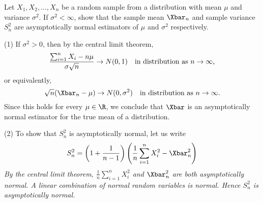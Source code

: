 
\begin{example}
Let $X_1,X_2,\ldots,X_n$ be a random sample from a distribution with mean $\mu$ and variance $\sigma^2$. If $\sigma^2<\infty$, show that the sample mean $\Xbar_n$ and sample variance $S^2_n$ are asymptotically normal estimators of $\mu$ and $\sigma^2$ respectively.

\begin{solution}
(1) If $\sigma^2>0$, then by the central limit theorem,
\[
\frac{\sum_{i=1}^n X_i- n\mu}{\sigma\sqrt{n}} \to N(0,1) \text{\quad in distribution as $n\to\infty$,}
\]
or equivalently,
\[
\sqrt{n}(\Xbar_n-\mu) \to N(0,\sigma^2) \text{\quad in distribution as $n\to\infty$.}
\]
Since this holds for every $\mu\in\R$, we conclude that $\Xbar$ is an asymptotically normal estimator for the true mean of a distribution.

(2) To show that $S^2_n$ is asymptotically normal, let us write
\[
S^2_n 	= \left(1+\frac{1}{n-1}\right)\left(\frac{1}{n}\sum_{i=1}^n X_i^2 - \Xbar_n^2\right)
\]
\bit
\it By the central limit theorem, $\displaystyle\frac{1}{n}\sum_{i=1}^n X_i^2$ and $\Xbar_n^2$ are both asymptotically normal. 
\it A linear combination of normal random variables is normal.
\it Hence $S^2_n$ is asymptotically normal.
\eit
\end{solution}
\end{example}

%
%



\stopcontents[chapters]
\endinput
